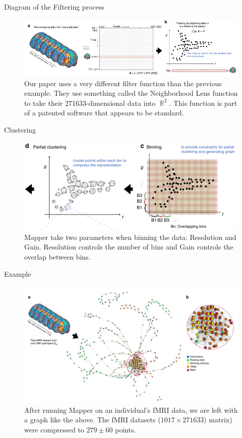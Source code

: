 \documentclass{beamer}
\DeclareMathOperator{\R}{\mathbb{R}}
\begin{document}
\begin{frame}{Diagram of the Filtering process}
    \begin{figure}
        \includegraphics[width = 0.9\linewidth]{fig1ab.png}
        \caption{Our paper uses a very different filter function than the previous example. They use something called the Neighborhood Lens function to take their 271633-dimensional data into $\R^2$. This function is part of a patented software that appears to be standard.}
    \end{figure}
\end{frame}

\begin{frame}{Clustering}
    \begin{figure}
        \includegraphics[width=0.8\linewidth]{fig1cd.png}
        \caption{Mapper take two parameters when binning the data: Resolution and Gain. Resolution controls the number of bins and Gain controls the overlap between bins.}
    \end{figure}
\end{frame}

\begin{frame}{Example}
    \begin{figure}
        \includegraphics[width = 0.85\linewidth]{fig2.png}
        \caption{After running Mapper on an individual's fMRI data, we are left with a graph like the above. The fMRI datasets ($1017\times271633)$ matrix) were compressed to $279\pm60$ points.}
    \end{figure}
\end{frame}
\end{document}
